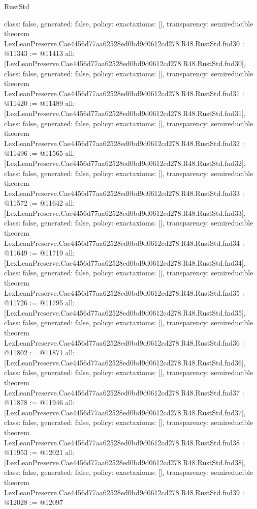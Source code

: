 \begin{lexlean}{RustStd}
\begin{coremodule}
{  class: false,
  generated: false,
  policy: exact{axioms: []},
  transparency: semireducible
}
theorem LexLeanPreserve.Cae4456d77aa62528ed0bd9d0612cd278.R48.RustStd.fnd30 : @11343 := @11413 {
  all: [LexLeanPreserve.Cae4456d77aa62528ed0bd9d0612cd278.R48.RustStd.fnd30],
  class: false,
  generated: false,
  policy: exact{axioms: []},
  transparency: semireducible
}
theorem LexLeanPreserve.Cae4456d77aa62528ed0bd9d0612cd278.R48.RustStd.fnd31 : @11420 := @11489 {
  all: [LexLeanPreserve.Cae4456d77aa62528ed0bd9d0612cd278.R48.RustStd.fnd31],
  class: false,
  generated: false,
  policy: exact{axioms: []},
  transparency: semireducible
}
theorem LexLeanPreserve.Cae4456d77aa62528ed0bd9d0612cd278.R48.RustStd.fnd32 : @11496 := @11565 {
  all: [LexLeanPreserve.Cae4456d77aa62528ed0bd9d0612cd278.R48.RustStd.fnd32],
  class: false,
  generated: false,
  policy: exact{axioms: []},
  transparency: semireducible
}
theorem LexLeanPreserve.Cae4456d77aa62528ed0bd9d0612cd278.R48.RustStd.fnd33 : @11572 := @11642 {
  all: [LexLeanPreserve.Cae4456d77aa62528ed0bd9d0612cd278.R48.RustStd.fnd33],
  class: false,
  generated: false,
  policy: exact{axioms: []},
  transparency: semireducible
}
theorem LexLeanPreserve.Cae4456d77aa62528ed0bd9d0612cd278.R48.RustStd.fnd34 : @11649 := @11719 {
  all: [LexLeanPreserve.Cae4456d77aa62528ed0bd9d0612cd278.R48.RustStd.fnd34],
  class: false,
  generated: false,
  policy: exact{axioms: []},
  transparency: semireducible
}
theorem LexLeanPreserve.Cae4456d77aa62528ed0bd9d0612cd278.R48.RustStd.fnd35 : @11726 := @11795 {
  all: [LexLeanPreserve.Cae4456d77aa62528ed0bd9d0612cd278.R48.RustStd.fnd35],
  class: false,
  generated: false,
  policy: exact{axioms: []},
  transparency: semireducible
}
theorem LexLeanPreserve.Cae4456d77aa62528ed0bd9d0612cd278.R48.RustStd.fnd36 : @11802 := @11871 {
  all: [LexLeanPreserve.Cae4456d77aa62528ed0bd9d0612cd278.R48.RustStd.fnd36],
  class: false,
  generated: false,
  policy: exact{axioms: []},
  transparency: semireducible
}
theorem LexLeanPreserve.Cae4456d77aa62528ed0bd9d0612cd278.R48.RustStd.fnd37 : @11878 := @11946 {
  all: [LexLeanPreserve.Cae4456d77aa62528ed0bd9d0612cd278.R48.RustStd.fnd37],
  class: false,
  generated: false,
  policy: exact{axioms: []},
  transparency: semireducible
}
theorem LexLeanPreserve.Cae4456d77aa62528ed0bd9d0612cd278.R48.RustStd.fnd38 : @11953 := @12021 {
  all: [LexLeanPreserve.Cae4456d77aa62528ed0bd9d0612cd278.R48.RustStd.fnd38],
  class: false,
  generated: false,
  policy: exact{axioms: []},
  transparency: semireducible
}
theorem LexLeanPreserve.Cae4456d77aa62528ed0bd9d0612cd278.R48.RustStd.fnd39 : @12028 := @12097 {
}
\end{coremodule}
\end{lexlean}
